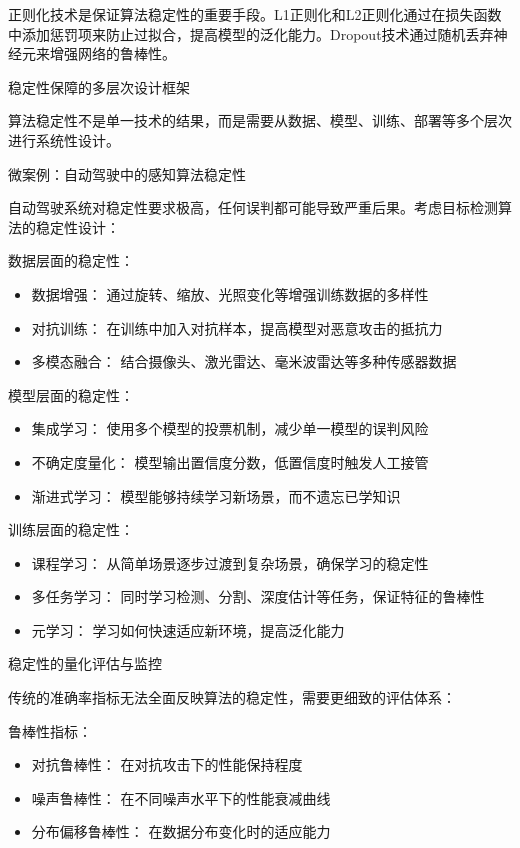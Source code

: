 正则化技术是保证算法稳定性的重要手段。L1正则化和L2正则化通过在损失函数中添加惩罚项来防止过拟合，提高模型的泛化能力。Dropout技术通过随机丢弃神经元来增强网络的鲁棒性。

稳定性保障的多层次设计框架

算法稳定性不是单一技术的结果，而是需要从数据、模型、训练、部署等多个层次进行系统性设计。

微案例：自动驾驶中的感知算法稳定性

自动驾驶系统对稳定性要求极高，任何误判都可能导致严重后果。考虑目标检测算法的稳定性设计：

数据层面的稳定性：
\begin{itemize}
\item 数据增强： 通过旋转、缩放、光照变化等增强训练数据的多样性
\item 对抗训练： 在训练中加入对抗样本，提高模型对恶意攻击的抵抗力
\item 多模态融合： 结合摄像头、激光雷达、毫米波雷达等多种传感器数据
\end{itemize}

模型层面的稳定性：
\begin{itemize}
\item 集成学习： 使用多个模型的投票机制，减少单一模型的误判风险
\item 不确定度量化： 模型输出置信度分数，低置信度时触发人工接管
\item 渐进式学习： 模型能够持续学习新场景，而不遗忘已学知识
\end{itemize}

训练层面的稳定性：
\begin{itemize}
\item 课程学习： 从简单场景逐步过渡到复杂场景，确保学习的稳定性
\item 多任务学习： 同时学习检测、分割、深度估计等任务，保证特征的鲁棒性
\item 元学习： 学习如何快速适应新环境，提高泛化能力
\end{itemize}

稳定性的量化评估与监控

传统的准确率指标无法全面反映算法的稳定性，需要更细致的评估体系：

鲁棒性指标：
\begin{itemize}
\item 对抗鲁棒性： 在对抗攻击下的性能保持程度
\item 噪声鲁棒性： 在不同噪声水平下的性能衰减曲线
\item 分布偏移鲁棒性： 在数据分布变化时的适应能力
\end{itemize}

